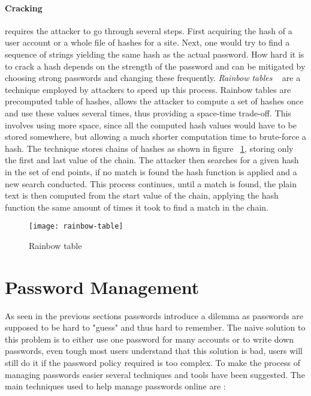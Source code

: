 \paragraph{Cracking} requires the attacker to go through several steps. First acquiring the hash of a user account or a whole file of hashes for a site. Next, one would try to find a sequence of strings yielding the same hash as the actual password. How hard it is to crack a hash depends on the strength of the password and can be mitigated by choosing strong passwords and changing these frequently.\emph{ Rainbow tables }~\cite{rainbow-tables} are a technique employed by attackers to speed up this process. Rainbow tables are precomputed table of hashes, allows the attacker to compute a set of hashes once and use these values several times, thus providing a space-time trade-off. This involves using more space, since all the computed hash values would have to be stored somewhere, but allowing a much shorter computation time to brute-force a hash. The technique stores chains of hashes as shown in figure ~\ref{rainbow-table}, storing only the first and last value of the chain. The attacker then searches for a given hash in the set of end points, if no match is found the hash function is applied and a new search conducted. This process continues, until a match is found, the plain text is then computed from the start value of the chain, applying the hash function the same amount of times it took to find a match in the chain. 

\begin{figure}[h]
    \texttt{[image: rainbow-table]}
    \caption{Rainbow table}
    \label{rainbow-table}
\end{figure}






\section{Password Management}
As seen in the previous sections passwords introduce a dilemma as passwords are supposed to be hard to "guess" and thus hard to remember. The naive solution to this problem is to either use one password for many accounts or to write down passwords, even tough most users understand that this solution is bad, users will still do it if the password policy required is too complex. To make the process of managing passwords easier several techniques and tools have been suggested. The main techniques used to help manage passwords online are \cite{management-strategies}: 


